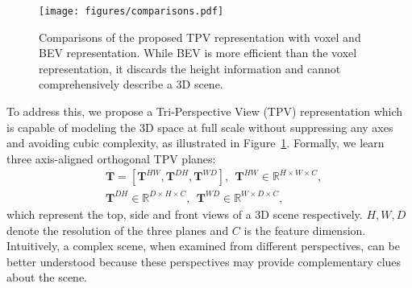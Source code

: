 \documentclass[10pt,twocolumn,letterpaper]{article}
\begin{document}
\begin{figure}[t]
\centering
\texttt{[image: figures/comparisons.pdf]}
\vspace{-7mm}
\caption{Comparisons of the proposed TPV representation with voxel and BEV representation.
While BEV is more efficient than the voxel representation, it discards the height information and cannot comprehensively describe a 3D scene.
}
\label{fig:comparisons}
\vspace{-6mm}
\end{figure}

To address this, we propose a Tri-Perspective View (TPV) representation which is capable of modeling the 3D space at full scale without suppressing any axes and avoiding cubic complexity, as illustrated in Figure~\ref{fig:comparisons}.
Formally, we learn three axis-aligned orthogonal TPV planes:
\begin{equation}\label{eqn: tpv planes def}
\begin{aligned}
    &\mathbf{T} = [\mathbf{T}^{HW}, \mathbf{T}^{DH}, \mathbf{T}^{WD}], \ \  \mathbf{T}^{HW}\in\mathbb{R}^{H\times W\times C}, \\
    &\mathbf{T}^{DH}\in\mathbb{R}^{D\times H\times C}, \ \  \mathbf{T}^{WD}\in\mathbb{R}^{W\times D\times C},
\end{aligned}
\end{equation}
which represent the top, side and front views of a 3D scene respectively.
$H,W,D$ denote the resolution of the three planes and $C$ is the feature dimension.
Intuitively, a complex scene, when examined from different perspectives, can be better understood because these perspectives may provide complementary clues about the scene.
\end{document}
